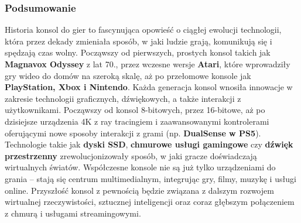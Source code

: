 \documentclass[8pt]{beamer}
\begin{document}
\begin{frame}
\frametitle{Podsumowanie}
Historia konsol do gier to fascynująca opowieść o ciągłej ewolucji technologii, która przez dekady zmieniała sposób, w jaki ludzie grają, komunikują się i spędzają czas wolny. Począwszy od pierwszych, prostych konsol takich jak \textbf {Magnavox Odyssey} z lat 70., przez wczesne wersje \textbf{Atari}, które wprowadziły gry wideo do domów na szeroką skalę, aż po przełomowe konsole jak \textbf {PlayStation, Xbox i Nintendo}.
\vspace{0.5em}
Każda generacja konsol wnosiła innowacje w zakresie technologii graficznych, dźwiękowych, a także interakcji z użytkownikami. Począwszy od konsol 8-bitowych, przez 16-bitowe, aż po dzisiejsze urządzenia 4K z ray tracingiem i zaawansowanymi kontrolerami oferującymi nowe sposoby interakcji z grami (np. \textbf {DualSense w PS5}). Technologie takie jak \textbf {dyski SSD}, \textbf {chmurowe usługi gamingowe} czy \textbf {dźwięk przestrzenny} zrewolucjonizowały sposób, w jaki gracze doświadczają wirtualnych światów.
\vspace{0.5em}
Współczesne konsole nie są już tylko urządzeniami do grania – stają się centrum multimedialnym, integrując gry, filmy, muzykę i usługi online. Przyszłość konsol z pewnością będzie związana z dalszym rozwojem wirtualnej rzeczywistości, sztucznej inteligencji oraz coraz głębszym połączeniem z chmurą i usługami streamingowymi.

\end{frame}
\end{document}
